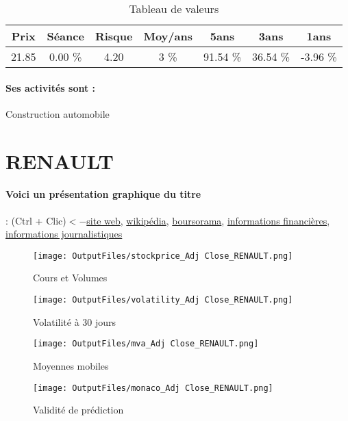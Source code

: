 \documentclass[11pt,a4paper]{report}%
\begin{document}
\begin{table}[H]
  \centering
    \begin{tabular}{|c|c|c|c|c|c|c|}
    \hline
    Prix & Séance & Risque  & Moy/ans & 5ans & 3ans & 1ans \\
    \hline
    21.85 &    0.00 \%    & 4.20 & 3 \% & 91.54 \% & 36.54 \% & -3.96 \% \\
    \hline
    \end{tabular}%
        \label{tab:table_PEUGEOT}%
      \caption{Tableau de valeurs}
\end{table}%

\paragraph{Ses activités sont : } Construction automobile 
    
    \newpage

\section{RENAULT}

\paragraph{Voici un présentation graphique du titre} : (Ctrl + Clic)$<-$\href{https://group.renault.com/finance/}{site web}, \href{https://fr.wikipedia.org/wiki/Renault}{wikipédia}, \href{https://www.boursorama.com/cours/1rPRNO}{boursorama}, \href{https://www.qwant.com/?q=site:https:%2f%2fwww.easybourse.com%2faction-societe%2fRENAULT&t=web&client=ext-firefox-hp}{informations financières}, \href{https://bourse.lerevenu.com/cours-de-bourse/fiche-valeur-synthese/RENAULT/RNO-FR}{informations journalistiques}
\begin{figure}[!htb]
   \begin{minipage}{0.5\textwidth}
     \centering
     \texttt{[image: OutputFiles/stockprice\_Adj Close\_RENAULT.png]}
     \caption{Cours et Volumes}\label{Fig:price_RENAULT}
   \end{minipage}\hfill
   \begin{minipage}{0.5\textwidth}
     \centering
     \texttt{[image: OutputFiles/volatility\_Adj Close\_RENAULT.png]}
     \caption{Volatilité à 30 jours}\label{Fig:volat_RENAULT}
   \end{minipage}
\end{figure}
\begin{figure}[!htb]
   \begin{minipage}{0.5\textwidth}
     \centering
     \texttt{[image: OutputFiles/mva\_Adj Close\_RENAULT.png]}
     \caption{Moyennes mobiles}\label{Fig:mva_RENAULT}
   \end{minipage}\hfill
   \begin{minipage}{0.5\textwidth}
     \centering
     \texttt{[image: OutputFiles/monaco\_Adj Close\_RENAULT.png]}
     \caption{Validité de prédiction}\label{Fig:prediction_RENAULT}
   \end{minipage}
\end{figure}
\end{document}
